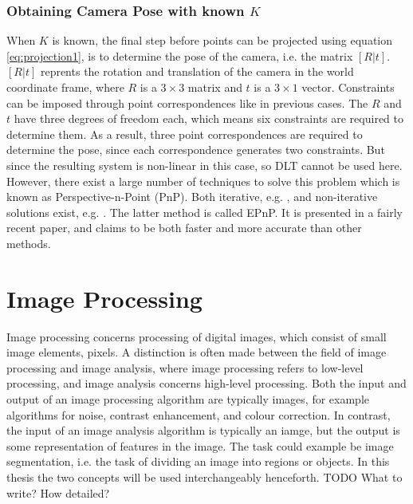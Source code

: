 \subsubsection{Obtaining Camera Pose with known $K$} \label{camera-pose}
When $K$ is known, the final step before points can be projected using equation \ref{eq:projection1}, is to determine the pose of the camera, i.e. the matrix $[R|t]$. $[R|t]$ reprents the rotation and translation of the camera in the world coordinate frame, where $R$ is a $3 \times 3$ matrix and $t$ is a $3 \times 1$ vector.
Constraints can be imposed through point correspondences like in previous cases.
The $R$ and $t$ have three degrees of freedom each, which means six constraints are required to determine them.
As a result, three point correspondences are required to determine the pose, since each correspondence generates two constraints.
But since the resulting system is non-linear in this case, so DLT cannot be used here. \cite[187]{hartley-zisserman}
However, there exist a large number of techniques to solve this problem which is known as Perspective-n-Point (PnP).
Both iterative, e.g. \cite{hesch-pnp} \cite{oberkampf-pnp}, and non-iterative solutions exist, e.g. \cite{quan-pnp} \cite{lepetit-pnp}.
The latter method is called EPnP.
It is presented in a fairly recent paper, and claims to be both faster and more accurate than other methods. 

\section{Image Processing}
Image processing concerns processing of digital images, which consist of small image elements, pixels.
A distinction is often made between the field of image processing and image analysis, where image processing refers to low-level processing, and image analysis concerns high-level processing.
Both the input and output of an image processing algorithm are typically images, for example algorithms for noise, contrast enhancement, and colour correction. 
In contrast, the input of an image analysis algorithm is typically an iamge, but the output is some representation of features in the image.
The task could example be image segmentation, i.e. the task of dividing an image into regions or objects.\cite[p. 1-2]{pitas}\cite[p. 1-2]{gonzalez-woods}
In this thesis the two concepts will be used interchangeably henceforth.
TODO What to write? How detailed?%

















